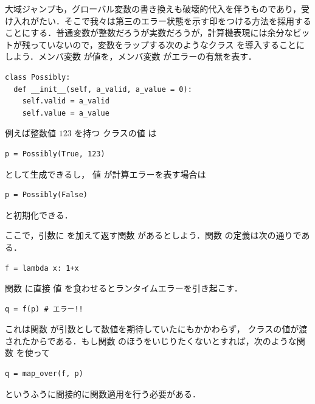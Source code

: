 \documentclass[a5paper,twoside,fleqn,draft]{jsbook}
\begin{document}
大域ジャンプも，グローバル変数の書き換えも破壊的代入を伴うものであり，受け入れがたい．そこで我々は第三のエラー状態を示す印をつける方法を採用することにする．普通変数が整数だろうが実数だろうが，計算機表現には余分なビットが残っていないので，変数をラップする次のようなクラス  を導入することにしよう．メンバ変数  が値を，メンバ変数  がエラーの有無を表す．
\begin{pythoncode}
\begin{verbatim}
class Possibly:
  def __init__(self, a_valid, a_value = 0):
    self.valid = a_valid
    self.value = a_value
\end{verbatim}
\end{pythoncode}

例えば整数値 $123$ を持つ  クラスの値  は
\begin{pythoncode}
\begin{verbatim}
p = Possibly(True, 123)
\end{verbatim}
\end{pythoncode}
として生成できるし， 値  が計算エラーを表す場合は
\begin{pythoncode}
\begin{verbatim}
p = Possibly(False)
\end{verbatim}
\end{pythoncode}
と初期化できる．

ここで，引数に  を加えて返す関数  があるとしよう．関数  の定義は次の通りである．
\begin{pythoncode}
\begin{verbatim}
f = lambda x: 1+x
\end{verbatim}
\end{pythoncode}

関数  に直接  値  を食わせるとランタイムエラーを引き起こす．
\begin{pythoncode}
\begin{verbatim}
q = f(p) # エラー!!
\end{verbatim}
\end{pythoncode}
これは関数  が引数として数値を期待していたにもかかわらず， クラスの値が渡されたからである．もし関数  のほうをいじりたくないとすれば，次のような関数  を使って
\begin{pythoncode}
\begin{verbatim}
q = map_over(f, p)
\end{verbatim}
\end{pythoncode}
というふうに間接的に関数適用を行う必要がある．
\end{document}
